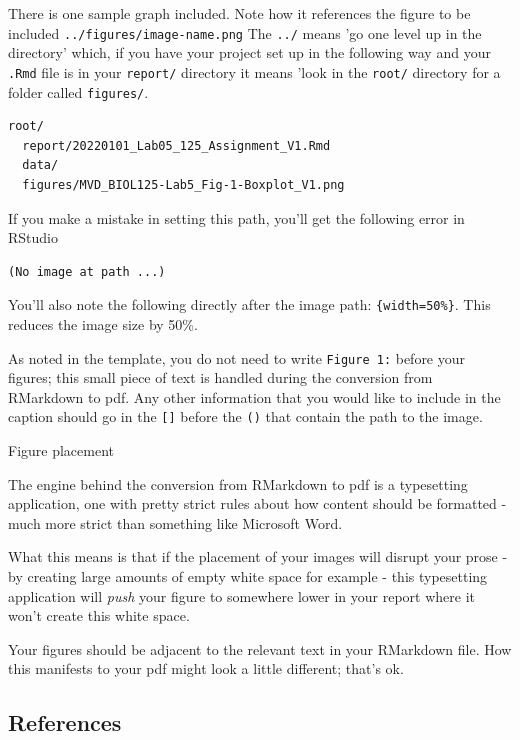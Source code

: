 \documentclass[
]{book}
\begin{document}
There is one sample graph included. Note how it references the figure to be included \texttt{../figures/image-name.png} The \texttt{../} means 'go one level up in the directory' which, if you have your project set up in the following way and your \texttt{.Rmd} file is in your \texttt{report/} directory it means 'look in the \texttt{root/} directory for a folder called \texttt{figures/}.

\begin{verbatim}
root/
  report/20220101_Lab05_125_Assignment_V1.Rmd
  data/
  figures/MVD_BIOL125-Lab5_Fig-1-Boxplot_V1.png
\end{verbatim}

If you make a mistake in setting this path, you'll get the following error in RStudio

\begin{verbatim}
(No image at path ...)
\end{verbatim}

You'll also note the following directly after the image path: \texttt{\{width=50\%\}}. This reduces the image size by 50\%.

As noted in the template, you do not need to write \texttt{Figure\ 1:} before your figures; this small piece of text is handled during the conversion from RMarkdown to pdf. Any other information that you would like to include in the caption should go in the \texttt{{[}{]}} before the \texttt{()} that contain the path to the image.

Figure placement

The engine behind the conversion from RMarkdown to pdf is a typesetting application, one with pretty strict rules about how content should be formatted - much more strict than something like Microsoft Word.

What this means is that if the placement of your images will disrupt your prose - by creating large amounts of empty white space for example - this typesetting application will \emph{push} your figure to somewhere lower in your report where it won't create this white space.

Your figures should be adjacent to the relevant text in your RMarkdown file. How this manifests to your pdf might look a little different; that's ok.

\hypertarget{references}{%
\subsection*{References}\label{references}}
\end{document}
